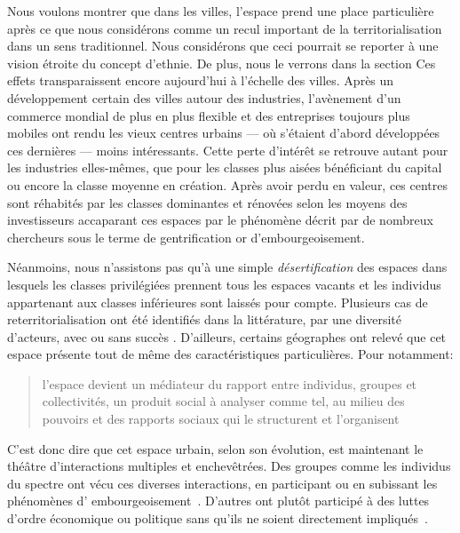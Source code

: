 Nous voulons montrer que dans les villes, l'espace prend une place particulière après ce que nous considérons comme un recul important de la territorialisation dans un sens traditionnel.
Nous considérons que ceci pourrait se reporter à une vision étroite du concept d'ethnie.
De plus, nous le verrons dans la section 
Ces effets transparaissent encore aujourd'hui à l'échelle des villes.
Après un développement certain des villes autour des industries, l'avènement d'un commerce mondial de plus en plus flexible et des entreprises toujours plus mobiles ont rendu les vieux centres urbains --- où s'étaient d'abord développées ces dernières --- moins intéressants.
Cette perte d'intérêt se retrouve autant pour les industries elles-mêmes, que pour les classes plus aisées bénéficiant du capital ou encore la classe moyenne en création.
Après avoir perdu en valeur, ces centres sont réhabités par les classes dominantes et rénovées selon les moyens des investisseurs accaparant ces espaces par le phénomène décrit par de nombreux chercheurs sous le terme de gentrification or d'embourgeoisement.

Néanmoins, nous n'assistons pas qu'à une simple \emph{désertification} des espaces dans lesquels les classes privilégiées prennent tous les espaces vacants et les individus appartenant aux classes inférieures sont laissés pour compte.
Plusieurs cas de reterritorialisation ont été identifiés dans la littérature, par une diversité d'acteurs, avec ou sans succès \citet{Hatvany2005}.
D'ailleurs, certains géographes ont relevé que cet espace présente tout de même des caractéristiques particulières.
Pour \citeauthor{Courville1991} notamment: \blockquote[{\cite[41]{Courville1991}}][.]{l'espace devient un médiateur du rapport entre individus, groupes et collectivités, un produit social à analyser comme tel, au milieu des pouvoirs et des rapports sociaux qui le structurent et l'organisent}.

C'est donc dire que cet espace urbain, selon son évolution, est maintenant le théâtre d'interactions multiples et enchevêtrées.
Des groupes comme les individus du spectre \lgbt{} ont vécu ces diverses interactions, en participant ou en subissant les phénomènes d’ embourgeoisement~\autocite{Podmore2001,Giraud2014,Hogan2005}.
D'autres ont plutôt participé à des luttes d'ordre économique ou politique sans qu'ils ne soient directement impliqués~\autocite{Kelliher2014}.

